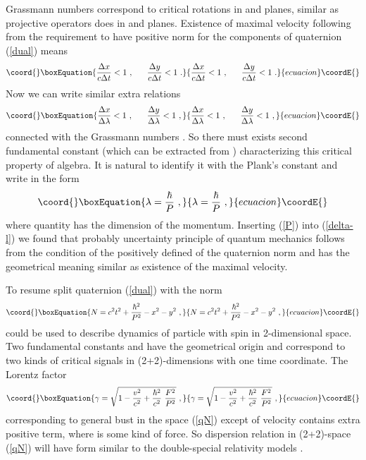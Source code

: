\documentclass[a4paper,12pt]{article}
\begin{document}
Grassmann numbers correspond to critical rotations in \coordHE{} and \coordHE{} planes, 
similar as projective operators does in \coordHE{} and \coordHE{} planes. Existence of 
maximal velocity following from the requirement to have positive norm for the components 
of quaternion (\ref{dual}) means
\begin{equation}\coord{}\boxEquation{ \label{delta-x}
\frac{\Delta x}{c\Delta t} < 1 ~, ~~~~~ \frac{\Delta y}{c\Delta t} < 1 ~.
}{ \frac{\Delta x}{c\Delta t} < 1 ~, ~~~~~ \frac{\Delta y}{c\Delta t} < 1 ~.
}{ecuacion}\coordE{}\end{equation}
Now we can write similar extra relations 
\begin{equation}\coord{}\boxEquation{ \label{delta-l}
\frac{\Delta x}{\Delta \lambda} < 1 ~, ~~~~~
\frac{\Delta y}{\Delta \lambda} < 1 ~, 
}{ \frac{\Delta x}{\Delta \lambda} < 1 ~, ~~~~~
\frac{\Delta y}{\Delta \lambda} < 1 ~, 
}{ecuacion}\coordE{}\end{equation}
connected with the Grassmann numbers \coordHE{}. So there must exists second fundamental 
constant (which can be extracted from \myHighlight{$\lambda$}\coordHE{}) characterizing this critical property 
of algebra. It is natural to identify it with the Plank's constant \myHighlight{$\hbar$}\coordHE{} and write 
\myHighlight{$\lambda$}\coordHE{} in the form
\begin{equation}\coord{}\boxEquation{ \label{P}
\lambda = \frac{\hbar}{P} ~, 
}{ \lambda = \frac{\hbar}{P} ~, 
}{ecuacion}\coordE{}\end{equation}
where quantity \coordHE{} has the dimension of the momentum. Inserting (\ref{P}) into 
(\ref{delta-l}) we found that probably uncertainty principle of quantum mechanics follows 
from the condition of the positively defined of the quaternion norm and has the geometrical
meaning similar as existence of the maximal velocity. 

To resume split quaternion (\ref{dual}) with the norm
\begin{equation}\coord{}\boxEquation{ \label{qN}
N = c^2t^2 + \frac{\hbar^2}{P^2} - x^2 - y^2 ~,
}{ N = c^2t^2 + \frac{\hbar^2}{P^2} - x^2 - y^2 ~,
}{ecuacion}\coordE{}\end{equation}
could be used to describe dynamics of particle with spin in 2-dimensional space. Two 
fundamental constants \coordHE{} and \myHighlight{$\hbar$}\coordHE{} have the geometrical origin and correspond to two 
kinds of critical signals in (2+2)-dimensions with one time coordinate. The Lorentz factor 
\begin{equation}\coord{}\boxEquation{ \label{qLorentz}
\gamma = \sqrt{1 - \frac{v^2}{c^2} + \frac{\hbar^2}{c^2}~ \frac{F^2}{P^2} }~,
}{ \gamma = \sqrt{1 - \frac{v^2}{c^2} + \frac{\hbar^2}{c^2}~ \frac{F^2}{P^2} }~,
}{ecuacion}\coordE{}\end{equation}
corresponding to general bust in the space (\ref{qN}) except of velocity \coordHE{} contains 
extra positive term, where \coordHE{} is some kind of force. So dispersion relation in (2+2)-space 
(\ref{qN}) will have form similar to the double-special relativity models \cite{double}. 
\end{document}
